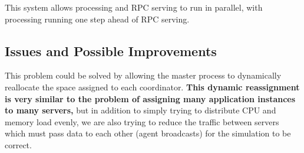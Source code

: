This system allows processing and RPC serving to run in parallel, with processing running one step
ahead of RPC serving.

\subsection{Issues and Possible Improvements}

This problem could be solved by allowing the master process to dynamically reallocate the space
assigned to each coordinator. \textbf{This dynamic reassignment is very similar to the problem of
assigning many application instances to many servers,} but in addition to simply trying to
distribute CPU and memory load evenly, we are also trying to reduce the traffic between servers
which must pass data to each other (agent broadcasts) for the simulation to be correct.
